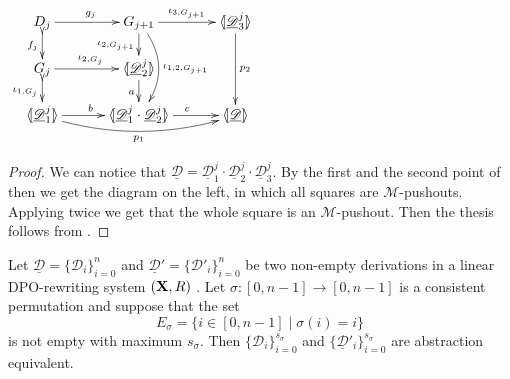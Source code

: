 \documentclass[a4paper,UKenglish,cleveref,pdftex,thm-restate,numberwithinsect,anonymous]{lipics}
\def\R{\mathsf{R}}
\def\X{\textbf {\textup{X}}}
\newcommand{\dder}[1]{\mathscr{#1}}
\newcommand{\der}[1]{\underline{\dder{#1}}}
\newcommand{\lpro}{\langle \hspace{-1.85pt}[}
\newcommand{\rpro}{]\hspace{-1.85pt}\rangle}
\newcommand{\tpro}[1]{\lpro \der{#1}\rpro}
\begin{document}
\noindent 
\parbox{5cm}{\vspace{1em}$
\xymatrix@C=30pt@R=15pt{D_{j} \ar[r]^{g_j}\ar@{>->}[d]_{f_j}& G_{j+1}
	\ar[r]^-{\iota_{3,G_{j+1}}} \ar[d]_{\iota_{2, G_{j+1}}}
	\ar@/^.5cm/[dd]^{\iota_{1,2, G_{j+1}}}& \lpro \der{D}^j_3\rpro
	\ar[dd]^{p_2} \\ G_j \ar[r]^{\iota_{2,
			G_j}}\ar@{>->}[d]_{\iota_{1,G_j}} & \lpro \der{D}^j_2\rpro
	\ar[d]_a\\ \lpro \der{D}^j_1 \rpro \ar@/_.4cm/[rr]_{p_1}
	\ar[r]^b &\lpro \der{D}^j_1\cdot \der{D}^j_2 \rpro
	\ar[r]^c&\tpro{D} }$}\qquad  \qquad
\parbox{7.5cm}{\begin{proof}
	We can notice that
	$\der{D}=\der{D}^j_1\cdot \der{D}^j_2 \cdot \der{D}^j_3$. By the
	first and the second point of  then we get the
	 diagram on the left, in which all squares are $\mathcal{M}$-pushouts. Applying  twice we get that the whole square is an
	$\mathcal{M}$-pushout. Then the thesis follows from
	.
\end{proof}}


\begin{lemma}\label{lem:idevero}
	Let $\der{D}=\{\dder{D}_{i}\}_{i=0}^n$ and $\der{D}'=\{\dder{D}'_i\}_{i=0}^n$ be two non-empty derivations in a linear DPO-rewriting system $(\X, \R)$ . Let  $\sigma:[0,n-1]\to [0,n-1]$  is a consistent permutation and suppose that the set 
	\[E_{\sigma}=\{i\in [0,n-1]\mid \sigma(i)=i\}\]
	is not empty with maximum $s_\sigma$. Then $\{\dder{D}_i\}_{i=0}^{s_\sigma}$ and $\{\der{D}'_i\}_{i=0}^{s_\sigma}$ are abstraction equivalent.  
\end{lemma}
\end{document}
